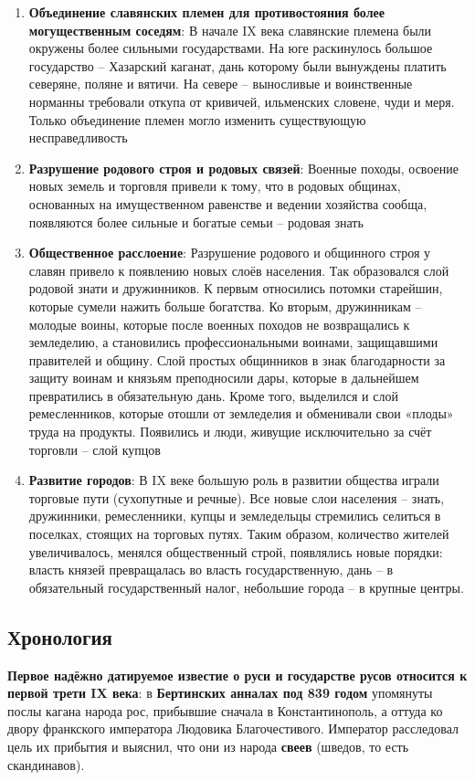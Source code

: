 \documentclass{article}
\begin{document}
\begin{enumerate}
    \item \textbf{Объединение славянских племен для противостояния более могущественным соседям}: В начале IX  века славянские племена были окружены более сильными государствами. На юге раскинулось большое государство – Хазарский каганат, дань которому были вынуждены платить северяне, поляне и вятичи. На севере –  выносливые и воинственные норманны требовали откупа от кривичей, ильменских словене, чуди и меря. Только объединение племен могло изменить существующую несправедливость
    \item \textbf{Разрушение родового строя и родовых связей}: Военные походы, освоение новых земель и торговля привели к тому, что в родовых общинах, основанных на имущественном равенстве и ведении хозяйства сообща, появляются более сильные и богатые семьи – родовая знать
    \item \textbf{Общественное расслоение}: Разрушение родового и общинного строя у славян привело к появлению новых слоёв населения. Так образовался слой родовой знати и дружинников. К первым относились потомки старейшин, которые сумели нажить больше богатства. Ко вторым, дружинникам – молодые воины, которые после военных походов не возвращались к земледелию, а становились профессиональными воинами, защищавшими правителей и общину. Слой простых общинников в знак благодарности за защиту воинам и князьям преподносили дары, которые в дальнейшем превратились в обязательную дань. Кроме того, выделился и слой ремесленников, которые отошли от земледелия и обменивали свои «плоды» труда на продукты. Появились и люди, живущие исключительно за счёт торговли – слой купцов
    \item \textbf{Развитие городов}: В IX веке большую роль в развитии общества играли торговые пути (сухопутные и речные). Все новые слои населения – знать, дружинники, ремесленники, купцы и земледельцы стремились селиться в поселках, стоящих на торговых путях. Таким образом, количество жителей увеличивалось, менялся общественный строй, появлялись новые порядки: власть князей превращалась во власть государственную, дань – в обязательный государственный налог, небольшие города – в крупные центры.
\end{enumerate}

\subsection{Хронология}

\textbf{Первое надёжно датируемое известие о руси и государстве русов относится к первой трети IX века}: в \textbf{Бертинских анналах под 839 годом} упомянуты послы кагана народа рос, прибывшие сначала в Константинополь, а оттуда ко двору франкского императора Людовика Благочестивого. Император расследовал цель их прибытия и выяснил, что они из народа \textbf{свеев} (шведов, то есть скандинавов).
\end{document}
